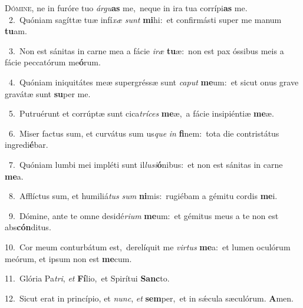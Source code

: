 \lettrine{\initial\textcolor{\initialcolor}{D}}{ómine,} ne in furóre tuo \textit{ár}\-\textit{gu}\textbf{as} me,~\star neque in ira tua corrípi\textbf{as} me.\\
{\numbfont\textcolor{\numbcolor}{~2.}}~Quóniam sagíttæ tuæ infí\textit{xæ} \textit{sunt} \textbf{mi}\-hi:~\star et confirmásti super me manum \textbf{tu}\-am.\par
{\numbfont\textcolor{\numbcolor}{~3.}}~Non est sánitas in carne mea a fácie \textit{i}\-\textit{ræ} \textbf{tu}\-æ:~\star non est pax óssibus meis a fácie peccatórum me\-\textbf{ó}\-rum.\par
{\numbfont\textcolor{\numbcolor}{~4.}}~Quóniam iniquitátes meæ supergréssæ sunt \textit{ca}\-\textit{put} \textbf{me}\-um:~\star et sicut onus grave gravátæ sunt \textbf{su}\-per me.\par
{\numbfont\textcolor{\numbcolor}{~5.}}~Putruérunt et corrúptæ sunt cica\-\textit{trí}\-\textit{ces} \textbf{me}\-æ,~\star a fácie insipiéntiæ \textbf{me}\-æ.\par
{\numbfont\textcolor{\numbcolor}{~6.}}~Miser factus sum, et curvátus sum us\textit{que} \textit{in} \textbf{fi}\-nem:~\star tota die contristátus ingredi\-\textbf{é}\-bar.\par
{\numbfont\textcolor{\numbcolor}{~7.}}~Quóniam lumbi mei impléti sunt il\-\textit{lu}\-\textit{si}\textbf{ó}nibus:~\star et non est sánitas in carne \textbf{me}\-a.\par
{\numbfont\textcolor{\numbcolor}{~8.}}~Afflíctus sum, et humiliá\textit{tus} \textit{sum} \textbf{ni}\-mis:~\star rugiébam a gémitu cordis \textbf{me}\-i.\par
{\numbfont\textcolor{\numbcolor}{~9.}}~Dómine, ante te omne desidé\-\textit{ri}\-\textit{um} \textbf{me}\-um:~\star et gémitus meus a te non est abs\-\textbf{cón}\-ditus.\par
{\numbfont\textcolor{\numbcolor}{10.}}~Cor meum conturbátum est,~\dagger derelíquit me \textit{vir}\-\textit{tus} \textbf{me}\-a:~\star et lumen oculórum meórum, et ipsum non est \textbf{me}\-cum.\par
{\numbfont\textcolor{\numbcolor}{11.}}~Glória Pa\-\textit{tri}\-, \textit{et} \textbf{Fí}\-lio,~\star et Spirítui \textbf{Sanc}\-to.\par
{\numbfont\textcolor{\numbcolor}{12.}}~Sicut erat in princípio, et \textit{nunc}\-, \textit{et} \textbf{sem}\-per,~\star et in sǽcula sæculórum. \textbf{A}\-men.\par

